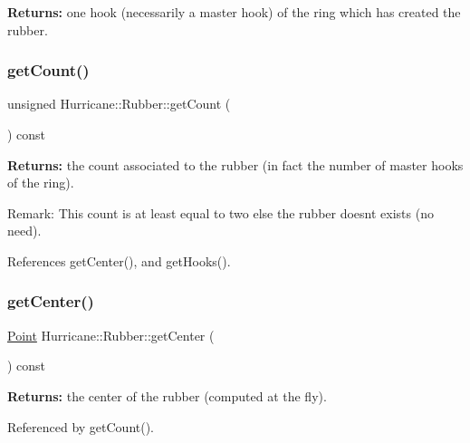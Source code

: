 {\bfseries Returns\+:} one hook (necessarily a master hook) of the ring which has created the rubber. \mbox{\label{classHurricane_1_1Rubber_a5fbe74e46313c0c1a264f0c7bda11e94}} 
\subsubsection{\texorpdfstring{get\+Count()}{getCount()}}
{\footnotesize\ttfamily unsigned Hurricane\+::\+Rubber\+::get\+Count (\begin{DoxyParamCaption}{ }\end{DoxyParamCaption}) const\hspace{0.3cm}{\ttfamily [inline]}}

{\bfseries Returns\+:} the count associated to the rubber (in fact the number of master hooks of the ring).

\begin{DoxyParagraph}{Remark\+:}
This count is at least equal to two else the rubber doesn\textquotesingle{}t exists (no need). 
\end{DoxyParagraph}


References get\+Center(), and get\+Hooks().

\mbox{\label{classHurricane_1_1Rubber_a124ef92401fd95ff794e381acd24e4ff}} 
\subsubsection{\texorpdfstring{get\+Center()}{getCenter()}}
{\footnotesize\ttfamily \hyperlink{classHurricane_1_1Point}{Point} Hurricane\+::\+Rubber\+::get\+Center (\begin{DoxyParamCaption}{ }\end{DoxyParamCaption}) const}

{\bfseries Returns\+:} the center of the rubber (computed at the fly). 

Referenced by get\+Count().

\mbox{\label{classHurricane_1_1Rubber_a6d87ff89d80fbaeeb6fea4157b92d1e3}} 
